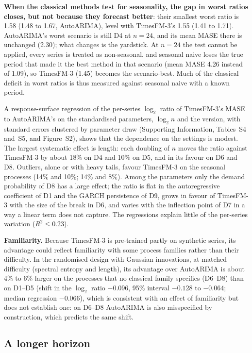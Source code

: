 \textbf{When the classical methods test for seasonality, the gap in worst ratios closes, but not because they
forecast better}: their smallest worst ratio is 1.58 (1.48 to 1.67, AutoARIMA), level with TimesFM-3's 1.55
(1.41 to 1.71). AutoARIMA's worst scenario is still D4 at $n = 24$, and its mean MASE there is unchanged (2.30);
what changes is the yardstick. At $n = 24$ the test cannot be applied, every series is treated as
non-seasonal, and seasonal naive loses the true period that made it the best method in that scenario (mean MASE
4.26 instead of 1.09), so TimesFM-3 (1.45) becomes the scenario-best. Much of the classical deficit in worst
ratios is thus measured against seasonal naive with a known period.

A response-surface regression of the per-series $\log_2$ ratio of TimesFM-3's MASE to AutoARIMA's on the
standardised parameters, $\log_2 n$ and the version, with standard errors clustered by parameter draw
(Supporting Information, Tables~S4 and~S5, and Figure~S2), shows that the dependence on the settings is
modest. The largest systematic effect is length: each doubling of $n$ moves the ratio against TimesFM-3 by about 18\% on D4 and 10\% on D5, and in its favour
on D6 and D8. Outliers, alone or with heavy tails, favour TimesFM-3 on the seasonal processes (14\% and 10\%;
14\% and 8\%). Among the
parameters only the demand probability of D8 has a large effect; the ratio is flat in the autoregressive
coefficient of D1 and the GARCH persistence of D9, grows in favour of TimesFM-3 with the size of the break in
D6, and varies with the inflection point of D7 in a way a linear term does not capture. The regressions
explain little of the per-series variation ($R^2 \leq 0.23$).

\textbf{Familiarity.} Because TimesFM-3 is pre-trained partly on synthetic series, its advantage could
reflect familiarity with some process families rather than their difficulty. In the randomised design with
Gaussian innovations, at matched difficulty (spectral entropy and length), its advantage over AutoARIMA is
about 4\% to 6\% larger on the processes
that no classical family specifies (D6--D8) than on D1--D5 (shift in the $\log_2$ ratio $-0.096$, 95\%
interval $-0.128$ to $-0.064$; median regression $-0.066$), which is consistent with an effect of familiarity but does not establish one: on D6--D8 AutoARIMA is also
misspecified by construction, which predicts the same shift.

\subsection{A longer horizon}
\label{sec:horizon48}

